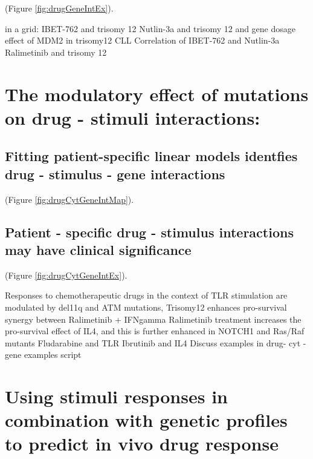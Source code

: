 \documentclass[11pt, a4paper, twosided]{book}
\begin{document}
(Figure \ref{fig:drugGeneIntEx}).



in a grid:
IBET-762 and trisomy 12
Nutlin-3a and trisomy 12 and gene dosage effect of MDM2 in trisomy12 CLL
Correlation of IBET-762 and Nutlin-3a
Ralimetinib and trisomy 12

\hypertarget{the-modulatory-effect-of-mutations-on-drug---stimuli-interactions}{%
\section{The modulatory effect of mutations on drug - stimuli interactions:}\label{the-modulatory-effect-of-mutations-on-drug---stimuli-interactions}}

\hypertarget{fitting-patient-specific-linear-models-identfies-drug---stimulus---gene-interactions}{%
\subsection{Fitting patient-specific linear models identfies drug - stimulus - gene interactions}\label{fitting-patient-specific-linear-models-identfies-drug---stimulus---gene-interactions}}

(Figure \ref{fig:drugCytGeneIntMap}).



\hypertarget{patient---specific-drug---stimulus-interactions-may-have-clinical-significance}{%
\subsection{Patient - specific drug - stimulus interactions may have clinical significance}\label{patient---specific-drug---stimulus-interactions-may-have-clinical-significance}}

(Figure \ref{fig:drugCytGeneIntEx}).



Responses to chemotherapeutic drugs in the context of TLR stimulation are modulated by del11q and ATM mutations,
Trisomy12 enhances pro-survival synergy between Ralimetinib + IFNgamma
Ralimetinib treatment increases the pro-survival effect of IL4, and this is further enhanced in NOTCH1 and Ras/Raf mutants
Fludarabine and TLR
Ibrutinib and IL4
Discuss examples in drug- cyt -gene examples script

\hypertarget{using-stimuli-responses-in-combination-with-genetic-profiles-to-predict-in-vivo-drug-response}{%
\section{Using stimuli responses in combination with genetic profiles to predict in vivo drug response}\label{using-stimuli-responses-in-combination-with-genetic-profiles-to-predict-in-vivo-drug-response}}
\end{document}
